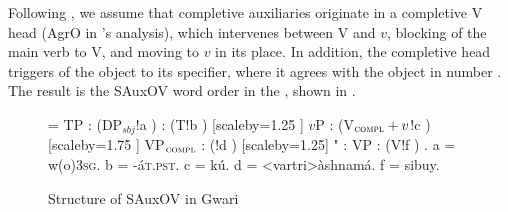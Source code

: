 \documentclass[output=paper]{LSP/langsci}
\begin{document}
%

Following \citet{kandy03}, we assume that completive auxiliaries originate in a completive V head (AgrO in \citet{kandy03}'s analysis), which intervenes between V and $v$, blocking  of the main verb to V, and moving to $v$ in its place. In addition, the completive head triggers  of the object to its specifier, where it agrees with the object in number . The result is the SAuxOV word order in the , shown in .

\begin{figure}
{\scriptsize \jtree[xunit=2.5em,yunit=1.25em]
\! = {TP}
: ({DP$_{sbj}$}!a ) 
: ({T}!b ) [scaleby=1.25 ] {$v$P}
: ({V$_\textsc{compl}+v$}!c ) [scaleby=1.75 ] {VP$_\textsc{compl}$}
: ({}!d ) [scaleby=1.25] 
"{} : {} {VP}
: ({V}!f ) {\sout{}}.
\!a = {w(o)}{\textsc{3sg}}.
\!b = {-\'{a}}{\textsc{t.pst}}.
\!c = {k\'u}{}.
\!d = <vartri>{\`ashnam\'a}{}.
\!f = {si}{buy}.
\endjtree}
\vspace{1.75em}
\caption{Structure of SAuxOV in Gwari}
\label{fig:sande:Gwari-OV}
\end{figure}
\end{document}
